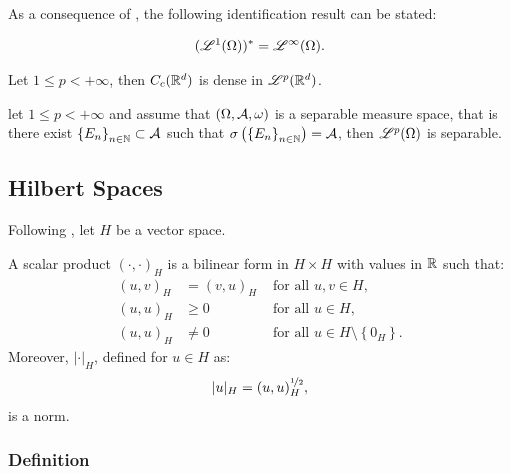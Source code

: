 As a consequence of , the following identification result can be stated:

\begin{theorem}
    \begin{align}
        (\mathscr{L}^{1}(\Omega))^* = \mathscr{L}^{\infty}(\Omega).
    \end{align}
\end{theorem}

\begin{theorem}
    Let $1 \leq p < +\infty$, then $C_c(\mathbb{R}^{d})$ is dense in $\mathscr{L}^{p}(\mathbb{R}^{d})$.
\end{theorem}

\begin{theorem}
    let $1 \leq p < +\infty$ and assume that $(\Omega, \mathcal{A}, \omega)$ is a separable measure space, that is there exist $\left\{ E_n \right\}_{n \in \mathbb{N}} \subset \mathcal{A}$ such that $\sigma \left( \left\{ E_n \right\}_{n \in \mathbb{N}} \right) = \mathcal{A}$, then $\mathscr{L}^{p}(\Omega)$ is separable.
\end{theorem}

\newpage
\subsection{Hilbert Spaces}

Following \cite[p.~131]{Brezis2010}, let $H$ be a vector space.

\begin{definition}
    A scalar product $\left( \cdot, \cdot \right)_H$ is a bilinear form in $H \times H$ with values in $\mathbb{R}$ such that:
    \begin{align}
        (u, v)_H & = (v, u)_H &\text{ for all } u, v \in H, \\
        (u, u)_H & \geq 0 &\text{ for all } u \in H, \\
        (u, u)_H & \neq 0 &\text{ for all } u \in H \setminus \left\{ 0_H \right\}.
    \end{align}
    Moreover, $\lvert \cdot \rvert_H$, defined for $u \in H$ as:
    \begin{align} %
        \lvert u \rvert_H = (u, u)_H^{\nicefrac12},
    \end{align}
    is a norm.
\end{definition}

\subsubsection{Definition}

